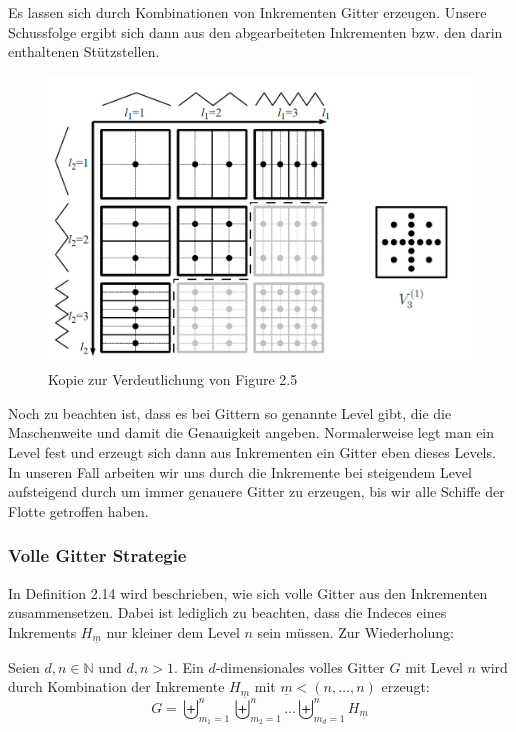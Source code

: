 \documentclass[a4paper,12pt]{llncs}
\numberwithin{equation}{section}
\begin{document}
Es lassen sich durch Kombinationen von Inkrementen Gitter erzeugen. Unsere Schussfolge ergibt sich dann aus den abgearbeiteten Inkrementen bzw. den darin enthaltenen Stützstellen. 

\begin{figure}
	\centering
	\includegraphics[width=0.75\linewidth]{figures/Gitter01}
	\caption{Kopie zur Verdeutlichung von \cite{P10} Figure 2.5}
	\label{fig:gitter01}
\end{figure}


Noch zu beachten ist, dass es bei Gittern so genannte Level gibt, die die Maschenweite und damit die Genauigkeit angeben. Normalerweise legt man ein Level fest und erzeugt sich dann aus Inkrementen ein Gitter eben dieses Levels. In unseren Fall arbeiten wir uns durch die Inkremente bei steigendem Level aufsteigend durch um immer genauere Gitter zu erzeugen, bis wir alle Schiffe der Flotte getroffen haben.

\subsubsection{Volle Gitter Strategie}

In \cite{M13} Definition 2.14 wird beschrieben, wie sich volle Gitter aus den Inkrementen zusammensetzen. Dabei ist lediglich zu beachten, dass die Indeces eines Inkrements $H_{\underline{m}}$ nur kleiner dem Level $n$ sein müssen.  Zur Wiederholung:

\begin{definition}
	Seien $d,n\in\mathbb{N}$ und $d,n>1$. Ein $d$-dimensionales volles Gitter $G$ mit Level $n$ wird durch Kombination der Inkremente $H_{\underline{m}}$ mit $\underline{m}<(n,\dots,n)$ erzeugt:
	\begin{equation}
		G=\biguplus_{m_1=1}^n\biguplus_{m_2=1}^n\dots \biguplus_{m_d=1}^n H_{\underline{m}}
	\end{equation}
\end{definition}
\end{document}
